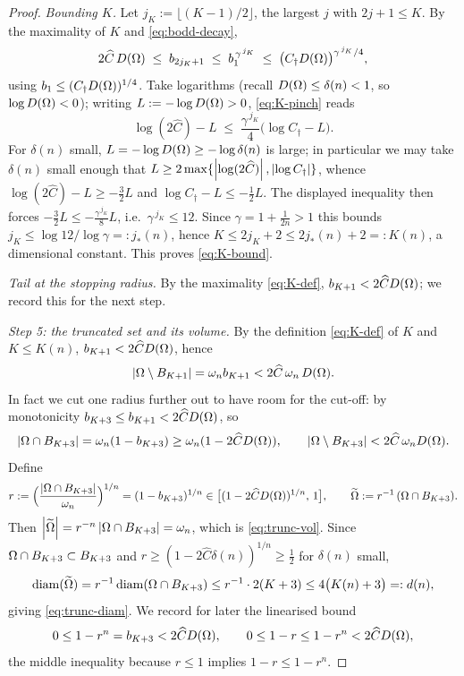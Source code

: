 \begin{proof}
\emph{Bounding $K$.} Let $j_K:=\lfloor(K-1)/2\rfloor$, the largest $j$
with $2j+1\le K$. By the maximality of $K$ and \eqref{eq:bodd-decay},
\begin{equation}\label{eq:K-pinch}
   2\widehat C\,D(\Omega)\;\le\;b_{2j_K+1}\;\le\;b_1^{\,\gamma^{\,j_K}}
   \;\le\;\bigl(C_\dagger D(\Omega)\bigr)^{\gamma^{\,j_K}/4},
\end{equation}
using $b_1\le(C_\dagger D(\Omega))^{1/4}$. Take logarithms (recall
$D(\Omega)\le\delta(n)<1$, so $\log D(\Omega)<0$); writing $L:=-\log D(\Omega)>0$,
\eqref{eq:K-pinch} reads
\[
   \log(2\widehat C)-L
   \;\le\;\frac{\gamma^{\,j_K}}{4}\bigl(\log C_\dagger-L\bigr).
\]
For $\delta(n)$ small, $L=-\log D(\Omega)\ge-\log\delta(n)$ is large; in
particular we may take $\delta(n)$ small enough that
$L\ge2\max\{\left|\log(2\widehat C)\right|,\left|\log C_\dagger\right|\}$, whence
$\log(2\widehat C)-L\ge-\tfrac32 L$ and $\log C_\dagger-L\le-\tfrac12 L$.
The displayed inequality then forces
$-\tfrac32 L\le-\tfrac{\gamma^{\,j_K}}{8}L$, i.e.\
$\gamma^{\,j_K}\le12$. Since $\gamma=1+\tfrac1{2n}>1$ this bounds
$j_K\le\log12/\log\gamma=:j_*(n)$, hence
$K\le2j_K+2\le2j_*(n)+2=:K(n)$, a dimensional constant. This proves
\eqref{eq:K-bound}.

\emph{Tail at the stopping radius.} By the maximality \eqref{eq:K-def},
$b_{K+1}<2\widehat C D(\Omega)$; we record this for the next step.

\smallskip
\emph{Step 5: the truncated set and its volume.}
By the definition \eqref{eq:K-def} of $K$ and $K\le K(n)$,
$b_{K+1}<2\widehat C D(\Omega)$, hence
\begin{equation}\label{eq:tail-controlled}
   \left|\Omega\setminus B_{K+1}\right|=\omega_n b_{K+1}<2\widehat C\,\omega_n\,D(\Omega).
\end{equation}
In fact we cut one radius further out to have room for the cut-off: by
monotonicity $b_{K+3}\le b_{K+1}<2\widehat C D(\Omega)$, so
\begin{equation}\label{eq:vol-cut}
   \left|\Omega\cap B_{K+3}\right|=\omega_n(1-b_{K+3})\ge\omega_n(1-2\widehat C D(\Omega)),
   \qquad
   \left|\Omega\setminus B_{K+3}\right|<2\widehat C\,\omega_n D(\Omega).
\end{equation}
Define
\[
   r:=\Bigl(\frac{\left|\Omega\cap B_{K+3}\right|}{\omega_n}\Bigr)^{1/n}
   =(1-b_{K+3})^{1/n}\in\bigl[(1-2\widehat C D(\Omega))^{1/n},\,1\bigr],
   \qquad
   \widetilde{\Omega}:=r^{-1}\,(\Omega\cap B_{K+3}).
\]
Then $\left|\widetilde{\Omega}\right|=r^{-n}\left|\Omega\cap B_{K+3}\right|=\omega_n$, which is
\eqref{eq:trunc-vol}. Since $\Omega\cap B_{K+3}\subset B_{K+3}$ and
$r\ge(1-2\widehat C\delta(n))^{1/n}\ge\tfrac12$ for $\delta(n)$ small,
\[
   \operatorname{diam}(\widetilde{\Omega})=r^{-1}\operatorname{diam}(\Omega\cap B_{K+3})\le r^{-1}\cdot2(K+3)
   \le4\bigl(K(n)+3\bigr)=:d(n),
\]
giving \eqref{eq:trunc-diam}. We record for later the linearised bound
\begin{equation}\label{eq:r-near-1}
   0\le1-r^n=b_{K+3}<2\widehat C D(\Omega),
   \qquad
   0\le1-r\le1-r^n<2\widehat C D(\Omega),
\end{equation}
the middle inequality because $r\le1$ implies $1-r\le1-r^n$.


\end{proof}
